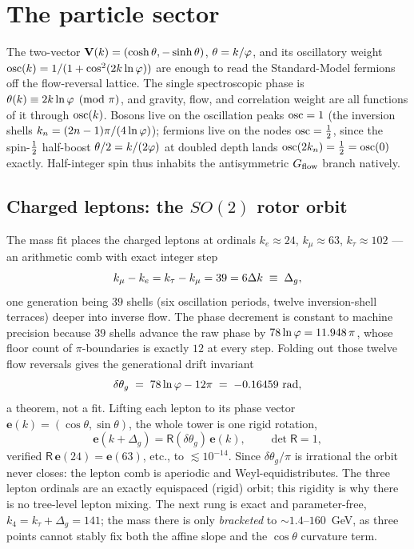 \section{The particle sector}\label{sec:particles}

The two-vector $\mathbf{V}(k)=(\cosh\theta,-\sinh\theta)$, $\theta=k/\varphi$, and its
oscillatory weight $\operatorname{osc}(k)=1/(1+\cos^2(2k\ln\varphi))$ are enough to read the
Standard-Model fermions off the flow-reversal lattice. The single spectroscopic
phase is $\theta(k)\equiv 2k\ln\varphi\pmod\pi$, and gravity, flow, and correlation
weight are all functions of it through $\operatorname{osc}(k)$. Bosons live on the
oscillation peaks $\operatorname{osc}=1$ (the inversion shells $k_n=(2n-1)\pi/(4\ln\varphi)$);
fermions live on the nodes $\operatorname{osc}=\tfrac12$, since the spin-$\tfrac12$ half-boost
$\theta/2=k/(2\varphi)$ at doubled depth lands $\operatorname{osc}(2k_n)=\tfrac12=\operatorname{osc}(0)$ exactly.
Half-integer spin thus inhabits the antisymmetric $G_{\mathrm{flow}}$ branch natively.

\subsection{Charged leptons: the $SO(2)$ rotor orbit}

The mass fit places the charged leptons at ordinals $k_e\approx 24$,
$k_\mu\approx 63$, $k_\tau\approx 102$ --- an arithmetic comb with exact integer
step
\begin{equation}
k_\mu-k_e=k_\tau-k_\mu=39=6\Delta k \;\equiv\; \Delta_g,
\label{eq:particles:step}
\end{equation}
one generation being $39$ shells (six oscillation periods, twelve inversion-shell
terraces) deeper into inverse flow. The phase decrement is constant to machine
precision because $39$ shells advance the raw phase by $78\ln\varphi=11.948\,\pi$,
whose floor count of $\pi$-boundaries is exactly $12$ at every step. Folding out
those twelve flow reversals gives the generational drift invariant
\begin{equation}
\delta\theta_g \;=\; 78\ln\varphi-12\pi \;=\; -0.16459\ \mathrm{rad},
\label{eq:particles:drift}
\end{equation}
a theorem, not a fit. Lifting each lepton to its phase vector
$\mathbf e(k)=(\cos\theta,\sin\theta)$, the whole tower is one rigid rotation,
\begin{equation}
\mathbf e(k+\Delta_g)=\mathsf R(\delta\theta_g)\,\mathbf e(k),
\qquad \det\mathsf R=1,
\label{eq:particles:rotor}
\end{equation}
verified $\mathsf R\,\mathbf e(24)=\mathbf e(63)$, etc., to $\lesssim 10^{-14}$.
Since $\delta\theta_g/\pi$ is irrational the orbit never closes: the lepton comb
is aperiodic and Weyl-equidistributes. The three lepton ordinals are an exactly
equispaced (rigid) orbit; this rigidity is why there is no tree-level lepton
mixing. The next rung is exact and parameter-free, $k_4=k_\tau+\Delta_g=141$;
the mass there is only \emph{bracketed} to $\sim1.4$--$160$~GeV, as three points
cannot stably fix both the affine slope and the $\cos\theta$ curvature term.

